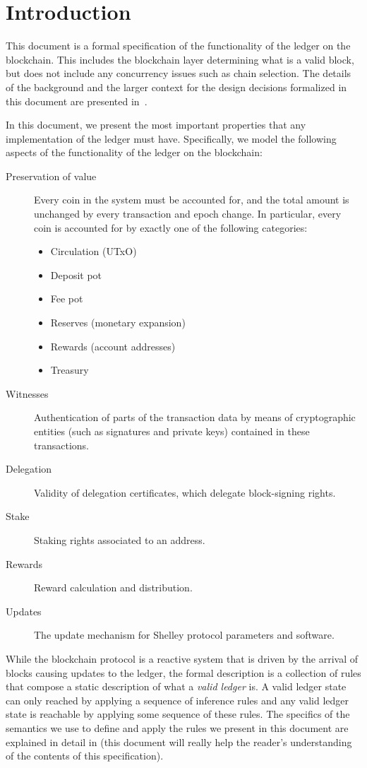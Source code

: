 \section{Introduction}
\label{sec:introduction-shelley}

This document is a formal specification of the functionality of the ledger on the blockchain.
This includes the blockchain layer determining what is a valid block,
but does not include any concurrency issues such as chain selection.
The details of the background and the larger context
for the design decisions formalized in this document are presented
in~\cite{delegation_design}.

In this document,
we present the most important properties that any implementation of the ledger must have.
Specifically, we model the following aspects
of the functionality of the ledger on the blockchain:

\begin{description}
\item[Preservation of value] Every coin in the system must be accounted for,
  and the total amount is unchanged by every transaction and epoch change.
  In particular, every coin is accounted for by exactly one of the following categories:
  \begin{itemize}
    \item Circulation (UTxO)
    \item Deposit pot
    \item Fee pot
    \item Reserves (monetary expansion)
    \item Rewards (account addresses)
    \item Treasury
  \end{itemize}
\item[Witnesses] Authentication of parts of the transaction data by means of
  cryptographic entities (such as signatures and private keys) contained in
  these transactions.
\item[Delegation] Validity of delegation certificates, which delegate
  block-signing rights.
\item[Stake] Staking rights associated to an address.
\item[Rewards] Reward calculation and distribution.
\item[Updates] The update mechanism for Shelley protocol parameters and software.
\end{description}

While the blockchain protocol is a reactive system that is driven by the arrival
of blocks causing updates to the ledger, the formal description is a collection
of rules that compose a
static description of what a \textit{valid ledger} is. A valid ledger state can only
reached by applying a sequence of inference rules and any valid ledger state
is reachable by applying some sequence of these rules.
The specifics of the semantics we use to define and apply
the rules we present in this document are explained in detail in
\cite{small_step_semantics} (this document will really help the reader's
understanding of the contents of this specification).

